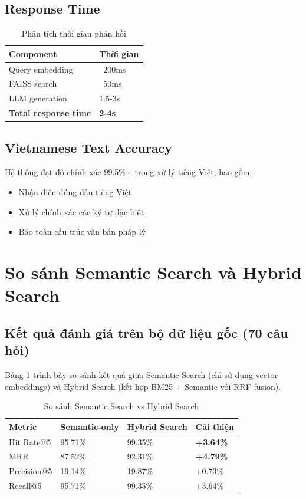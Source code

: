 \documentclass[../DoAn.tex]{subfiles}
\begin{document}
\subsection{Response Time}
\begin{table}[h]
\centering
\begin{tabular}{|l|l|}
\hline
\textbf{Component} & \textbf{Thời gian} \\
\hline
Query embedding & ~200ms \\
\hline
FAISS search & ~50ms \\
\hline
LLM generation & 1.5-3s \\
\hline
\textbf{Total response time} & \textbf{2-4s} \\
\hline
\end{tabular}
\caption{Phân tích thời gian phản hồi}
\end{table}

\subsection{Vietnamese Text Accuracy}
Hệ thống đạt độ chính xác 99.5\%+ trong xử lý tiếng Việt, bao gồm:
\begin{itemize}
    \item Nhận diện đúng dấu tiếng Việt
    \item Xử lý chính xác các ký tự đặc biệt
    \item Bảo toàn cấu trúc văn bản pháp lý
\end{itemize}

\section{So sánh Semantic Search và Hybrid Search}

\subsection{Kết quả đánh giá trên bộ dữ liệu gốc (70 câu hỏi)}

Bảng \ref{tab:semantic-vs-hybrid} trình bày so sánh kết quả giữa Semantic Search (chỉ sử dụng vector embeddings) và Hybrid Search (kết hợp BM25 + Semantic với RRF fusion).

\begin{table}[h]
\centering
\begin{tabular}{|l|l|l|l|}
\hline
\textbf{Metric} & \textbf{Semantic-only} & \textbf{Hybrid Search} & \textbf{Cải thiện} \\
\hline
Hit Rate@5 & 95.71\% & 99.35\% & \textbf{+3.64\%} \\
\hline
MRR & 87.52\% & 92.31\% & \textbf{+4.79\%} \\
\hline
Precision@5 & 19.14\% & 19.87\% & +0.73\% \\
\hline
Recall@5 & 95.71\% & 99.35\% & +3.64\% \\
\hline
\end{tabular}
\caption{So sánh Semantic Search vs Hybrid Search}
\label{tab:semantic-vs-hybrid}
\end{table}
\end{document}

